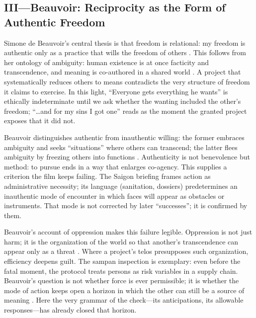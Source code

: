 \subsection*{III—Beauvoir: Reciprocity as the Form of Authentic Freedom}
\label{ssec:iii-beauvoir}
Simone de Beauvoir's central thesis is that freedom is relational: my freedom is authentic only as a
practice that wills the freedom of others \parencite[p.~73]{Beauvoir1976}. This follows from
her ontology of ambiguity: human existence is at once facticity and transcendence, and meaning
is co-authored in a shared world \parencite[pp.~9--14, 24--30]{Beauvoir1976}. A project that
systematically reduces others to means contradicts the very structure of freedom it claims to
exercise. In this light, ``Everyone gets everything he wants'' is ethically indeterminate until
we ask whether the wanting included the other's freedom; ``\ldots and for my sins I got one''
reads as the moment the granted project exposes that it did not.

Beauvoir distinguishes authentic from inauthentic willing: the former embraces ambiguity and
seeks ``situations'' where others can transcend; the latter flees ambiguity by freezing others
into functions \parencite[pp.~70--76, 134--145]{Beauvoir1976}. Authenticity is not benevolence
but method: to pursue ends in a way that enlarges co-agency. This supplies a criterion the film
keeps failing. The Saigon briefing frames action as administrative necessity; its language
(sanitation, dossiers) predetermines an inauthentic mode of encounter in which faces will appear
as obstacles or instruments. That mode is not corrected by later ``successes''; it is confirmed
by them.

Beauvoir's account of oppression makes this failure legible. Oppression is not just harm; it is
the organization of the world so that another's transcendence can appear only as a threat
\parencite[pp.~85--91, 157--161]{Beauvoir1976}. Where a project's telos presupposes such
organization, efficiency deepens guilt. The sampan inspection is exemplary: even before the
fatal moment, the protocol treats persons as risk variables in a supply chain. Beauvoir's
question is not whether force is ever permissible; it is whether the mode of action keeps open
a horizon in which the other can still be a source of meaning
\parencite[pp.~139--147, 164--173]{Beauvoir1976}. Here the very grammar of the check—its
anticipations, its allowable responses—has already closed that horizon.

